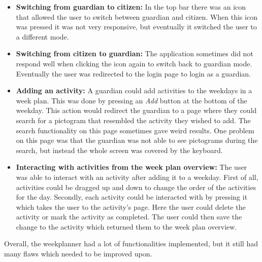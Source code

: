 \begin{itemize}
    \item \textbf{Switching from guardian to citizen:} In the top bar there was an icon that allowed the user to switch between guardian and citizen.
    When this icon was pressed it was not very responsive, but eventually it switched the user to a different mode.
    \item \textbf{Switching from citizen to guardian:} The application sometimes did not respond well when clicking the icon again to switch back to guardian mode.
    Eventually the user was redirected to the login page to login as a guardian.
    \item \textbf{Adding an activity:} A guardian could add activities to the weekdays in a week plan.
    This was done by pressing an \textit{Add} button at the bottom of the weekday.
    This action would redirect the guardian to a page where they could search for a pictogram that resembled the activity they wished to add.
    The search functionality on this page sometimes gave weird results.
    One problem on this page was that the guardian was not able to see pictograms during the search, but instead the whole screen was covered by the keyboard.
    \item \textbf{Interacting with activities from the week plan overview:}  The user was able to interact with an activity after adding it to a weekday.
    First of all, activities could be dragged up and down to change the order of the activities for the day.
    Secondly, each activity could be interacted with by pressing it which takes the user to the activity's page.
    Here the user could delete the activity or mark the activity as completed.
    The user could then save the change to the activity which returned them to the week plan overview.
\end{itemize}
Overall, the weekplanner had a lot of functionalities implemented, but it still had many flaws which needed to be improved upon.
